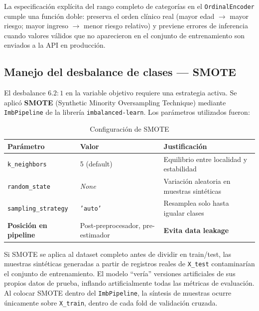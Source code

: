 \documentclass[12pt,a4paper]{article}
\begin{document}
La especificación explícita del rango completo de categorías en el \texttt{OrdinalEncoder} cumple una función doble: preserva el orden clínico real (mayor edad $\rightarrow$ mayor riesgo; mayor ingreso $\rightarrow$ menor riesgo relativo) y previene errores de inferencia cuando valores válidos que no aparecieron en el conjunto de entrenamiento son enviados a la API en producción.

\subsection{Manejo del desbalance de clases — SMOTE}

El desbalance $6.2:1$ en la variable objetivo requiere una estrategia activa. Se aplicó \textbf{SMOTE} (Synthetic Minority Oversampling Technique) mediante \texttt{ImbPipeline} de la librería \texttt{imbalanced-learn}. Los parámetros utilizados fueron:

\begin{table}[H]
  \centering
  \caption{Configuración de SMOTE}
  \begin{tabular}{lll}
    \toprule
    \textbf{Parámetro} & \textbf{Valor} & \textbf{Justificación}\\
    \midrule
    \texttt{k\_neighbors} & 5 (default) & Equilibrio entre localidad y estabilidad\\
    \texttt{random\_state} & \textit{None} & Variación aleatoria en muestras sintéticas\\
    \texttt{sampling\_strategy} & \texttt{'auto'} & Resamplea solo hasta igualar clases\\
    \textbf{Posición en pipeline} & Post-preprocesador, pre-estimador & \textbf{Evita data leakage}\\
    \bottomrule
  \end{tabular}
\end{table}

\begin{alertbox}
  Si SMOTE se aplica al dataset completo antes de dividir en train/test, las muestras sintéticas generadas a partir de registros reales de \texttt{X\_test} contaminarían el conjunto de entrenamiento. El modelo ``vería'' versiones artificiales de sus propios datos de prueba, inflando artificialmente todas las métricas de evaluación. Al colocar SMOTE dentro del \texttt{ImbPipeline}, la síntesis de muestras ocurre únicamente sobre \texttt{X\_train}, dentro de cada fold de validación cruzada.
\end{alertbox}
\end{document}
